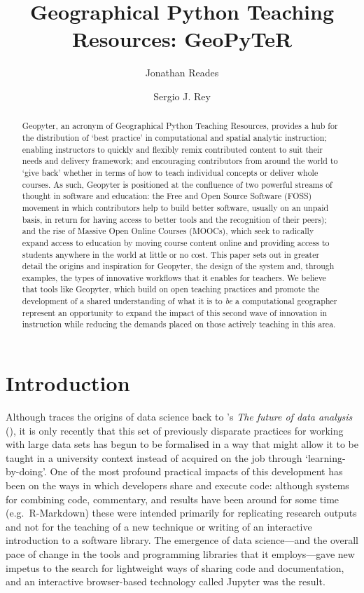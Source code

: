 \documentclass[letter, 11pt,titlepage]{article}
\title{Geographical Python Teaching Resources: GeoPyTeR}
\author{Jonathan Reades \and Sergio J. Rey}
\newcommand{\eg}{e.g.~\/}
\begin{document}
\maketitle

\begin{abstract}
Geopyter, an acronym of Geographical Python Teaching Resources, provides
a hub for the distribution of `best practice' in computational and
spatial analytic instruction; enabling instructors to quickly and
flexibly remix contributed content to suit their needs and delivery
framework; and encouraging contributors from around the world to `give
back' whether in terms of how to teach individual concepts or deliver
whole courses. As such, Geopyter is positioned at the confluence of two
powerful streams of thought in software and education: the Free and Open
Source Software (FOSS) movement in which contributors help to build
better software, usually on an unpaid basis, in return for having access
to better tools and the recognition of their peers); and the rise of
Massive Open Online Courses (MOOCs), which seek to radically expand
access to education by moving course content online and providing access
to students anywhere in the world at little or no cost. This paper sets
out in greater detail the origins and inspiration for Geopyter, the
design of the system and, through examples, the types of innovative
workflows that it enables for teachers. We believe that tools like
Geopyter, which build on open teaching practices and promote the
development of a shared understanding of what it is to \emph{be} a
computational geographer represent an opportunity to expand the impact
of this second wave of innovation in instruction while reducing the
demands placed on those actively teaching in this area.
\end{abstract}


\section{Introduction}\label{introduction}

Although \citet{Donoho2017} traces the origins of data science back to
\citeauthor{Tukey1962}'s \textit{The future of data analysis}
(\citeyear{Tukey1962}), it is only recently that this set of previously disparate practices for working with large data sets has begun to be formalised in a way that might allow it to be taught in a university context instead of acquired on the job through `learning-by-doing'. One of the most profound practical impacts of this development has been on the ways in which developers share and execute code: although systems for combining code, commentary, and results have been around for some time (\eg R-Markdown) these were intended primarily for replicating research outputs and not for the teaching of a new technique or writing of an interactive introduction to a software library. The emergence of data science---and the overall pace of change in the tools and programming libraries that it employs---gave new impetus to the search for lightweight ways of sharing code and documentation, and an interactive browser-based technology called Jupyter was the result.
\end{document}
